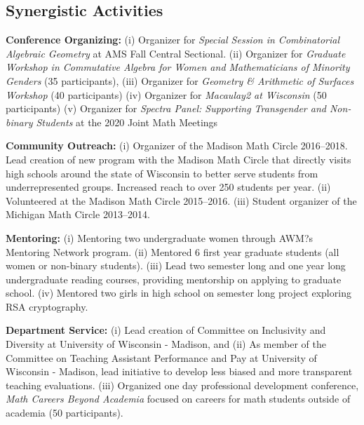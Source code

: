 \documentclass[svgnames,11pt]{article}
\begin{document}
\subsection{Synergistic Activities}

\begin{bibenum}[itemsep=4pt]

    \item \textbf{Conference Organizing:}
        (i) Organizer for \textit{Special Session in Combinatorial Algebraic Geometry} at AMS Fall Central Sectional. 
        (ii) Organizer for \textit{Graduate Workshop in Commutative Algebra for Women and Mathematicians of Minority Genders} (35 participants), 
        (iii) Organizer for \textit{Geometry \& Arithmetic of Surfaces Workshop} (40 participants)
        (iv) Organizer for \textit{Macaulay2 at Wisconsin} (50 participants)
        (v) Organizer for \textit{Spectra Panel: Supporting Transgender and Non-binary Students} at the 2020 Joint Math Meetings
    

    \item \textbf{Community Outreach:}
    	(i) Organizer of the Madison Math Circle 2016--2018. Lead creation of new program with the Madison Math Circle that directly visits high schools around the state of Wisconsin to better serve students from underrepresented groups. Increased reach to over 250 students per year.
	(ii)  Volunteered at the Madison Math Circle 2015--2016.
	(iii) Student organizer of the Michigan Math Circle 2013--2014.

    \item \textbf{Mentoring:}
        (i) Mentoring two undergraduate women through AWM?s Mentoring Network program.
        (ii) Mentored 6 first year graduate students (all women or non-binary students).
        (iii) Lead two semester long and one year long undergraduate reading courses, providing mentorship on applying to graduate school.
        (iv) Mentored two girls in high school on semester long project exploring RSA cryptography.
        
           
    \item \textbf{Department Service:} 
    (i) Lead creation of Committee on Inclusivity and Diversity at University of Wisconsin - Madison, and 
    (ii) As member of the Committee on Teaching Assistant Performance and Pay at University of Wisconsin - Madison, lead initiative to develop less biased and more transparent teaching evaluations. 
    (iii) Organized one day professional development conference, \textit{Math Careers Beyond Academia} focused on careers for math students outside of academia (50 participants). 


\end{bibenum}
\end{document}
